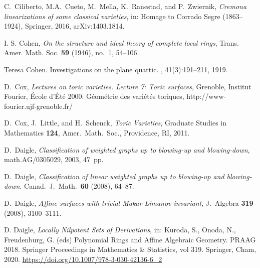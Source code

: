 C.~Ciliberto, M.A.~Cueto, M.~Mella, K.~Ranestad, and P.~Zwiernik,
\emph{Cremona linearizations of some classical varieties},
in: Homage to Corrado Segre (1863--1924), Springer, 2016, arXiv:1403.1814.

I. S. Cohen, \emph{On the structure and ideal theory of complete local rings}, Trans. Amer. Math. Soc. \textbf{59} (1946), no.~1, 54--106.

Teresa Cohen.
\newblock Investigations on the plane quartic.
, 41(3):191--211, 1919.




D.~Cox, \emph{Lectures on toric varieties.  Lecture 7: Toric surfaces},
Grenoble, Institut Fourier, \'Ecole
d'\'Et\'e 2000: G\'eom\'etrie des vari\'et\'es toriques, http://www-fourier.ujf-grenoble.fr/

D.~Cox, J.~Little, and H.~Schenck,
\emph{Toric Varieties},
Graduate Studies in Mathematics \textbf{124},
Amer.\ Math.\ Soc., Providence, RI, 2011.


D.~Daigle,
\emph{Classification of weighted graphs up to blowing-up and blowing-down},
math.AG/0305029, 2003, 47~pp.

D.~Daigle,
\emph{Classification of linear weighted graphs
up to blowing-up and blowing-down}.
Canad.\ J.\ Math.\ \textbf{60} (2008),
64--87.

D.~Daigle,
\emph{Affine surfaces with trivial Makar-Limanov invariant},
J.\ Algebra \textbf{319} (2008), 3100--3111.

D. Daigle, \emph{Locally Nilpotent Sets of Derivations}, in: Kuroda, S., Onoda, N., Freudenburg, G. (eds) Polynomial Rings and Affine Algebraic Geometry.
   PRAAG 2018. Springer Proceedings in Mathematics \& Statistics, vol 319. Springer, Cham, 2020. \url{https://doi.org/10.1007/978-3-030-42136-6_2}

